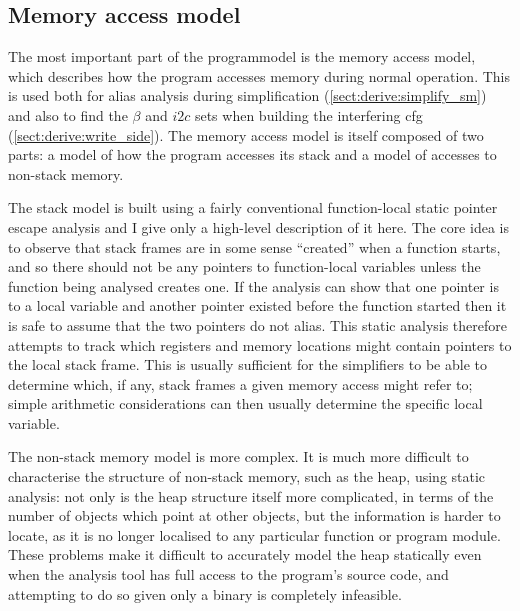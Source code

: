 \subsection{Memory access model}
\label{sect:program_model:dynamic_alias}

The most important part of the \gls{programmodel} is the memory access
model, which describes how the program accesses memory during normal
operation.  This is used both for alias analysis during
{\StateMachine} simplification (\autoref{sect:derive:simplify_sm}) and
also to find the $\beta$ and $i2c$ sets when building the interfering
\gls{cfg} (\autoref{sect:derive:write_side}).  The memory access model
is itself composed of two parts: a model of how the program accesses
its stack and a model of accesses to non-stack memory.

The stack model is built using a fairly conventional function-local
static pointer escape analysis\needCite{} and I give only a high-level
description of it here.  The core idea is to observe that stack frames
are in some sense ``created'' when a function starts, and so there
should not be any pointers to function-local variables unless the
function being analysed creates one.  If the analysis can show that
one pointer is to a local variable and another pointer existed before
the function started then it is safe to assume that the two pointers
do not alias.  This static analysis therefore attempts to track which
registers and memory locations might contain pointers to the local
stack frame.  This is usually sufficient for the {\StateMachine}
simplifiers to be able to determine which, if any, stack frames a
given memory access might refer to; simple arithmetic considerations
can then usually determine the specific local variable.

The non-stack memory model is more complex.  It is much more difficult
to characterise the structure of non-stack memory, such as the heap,
using static analysis: not only is the heap structure itself more
complicated, in terms of the number of objects which point at other
objects, but the information is harder to locate, as it is no longer
localised to any particular function or program module.  These
problems make it difficult to accurately model the heap statically
even when the analysis tool has full access to the program's source
code\needCite{}, and attempting to do so given only a binary is
completely infeasible.

